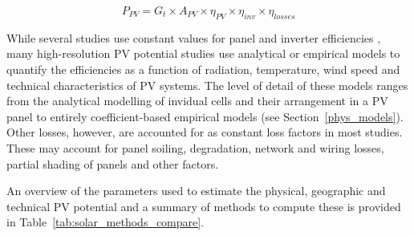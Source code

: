 \begin{equation}
    P_{PV} = G_t \times A_{PV} \times \eta_{PV} \times \eta_\mathit{inv} \times \eta_\mathit{losses}
\end{equation}

While several studies use constant values for panel and inverter efficiencies \cite{assouline_quantifying_2017,wegertseder_combining_2016,romero_rodriguez_assessment_2017,ordonez_analysis_2010,hong_development_2017}, many high-resolution PV potential studies use analytical or empirical models to quantify the efficiencies as a function of radiation, temperature, wind speed and technical characteristics of PV systems. The level of detail of these models ranges from the analytical modelling of invidual cells and their arrangement in a PV panel \cite{buffat_scalable_2018} to entirely coefficient-based empirical models \cite{mainzer_assessment_2017} (see Section~\ref{phys_models}). Other losses, however, are accounted for as constant loss factors in most studies. These may account for panel soiling, degradation, network and wiring losses, partial shading of panels and other factors.

An overview of the parameters used to estimate the physical, geographic and technical PV potential and a summary of methods to compute these is provided in Table~\ref{tab:solar_methods_compare}.


